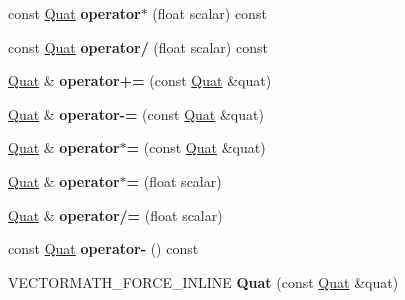 \begin{DoxyCompactItemize}
const \hyperlink{classVectormath_1_1Aos_1_1Quat}{Quat} {\bfseries operator$\ast$} (float scalar) const
\item 
\mbox{\label{classVectormath_1_1Aos_1_1Quat_ac427bfc84af666d57eebeab78da5f695}} 
const \hyperlink{classVectormath_1_1Aos_1_1Quat}{Quat} {\bfseries operator/} (float scalar) const
\item 
\mbox{\label{classVectormath_1_1Aos_1_1Quat_aabe44e8d880be75a7ebb00b0699585ba}} 
\hyperlink{classVectormath_1_1Aos_1_1Quat}{Quat} \& {\bfseries operator+=} (const \hyperlink{classVectormath_1_1Aos_1_1Quat}{Quat} \&quat)
\item 
\mbox{\label{classVectormath_1_1Aos_1_1Quat_ac5e010e1374872925702919385572dc9}} 
\hyperlink{classVectormath_1_1Aos_1_1Quat}{Quat} \& {\bfseries operator-\/=} (const \hyperlink{classVectormath_1_1Aos_1_1Quat}{Quat} \&quat)
\item 
\mbox{\label{classVectormath_1_1Aos_1_1Quat_aa2236fb5e7006f0bf72a23b4a4606c13}} 
\hyperlink{classVectormath_1_1Aos_1_1Quat}{Quat} \& {\bfseries operator$\ast$=} (const \hyperlink{classVectormath_1_1Aos_1_1Quat}{Quat} \&quat)
\item 
\mbox{\label{classVectormath_1_1Aos_1_1Quat_ab5da49301367b36085a58c53734433c9}} 
\hyperlink{classVectormath_1_1Aos_1_1Quat}{Quat} \& {\bfseries operator$\ast$=} (float scalar)
\item 
\mbox{\label{classVectormath_1_1Aos_1_1Quat_a5af07567b079fe049ca809335c5c3848}} 
\hyperlink{classVectormath_1_1Aos_1_1Quat}{Quat} \& {\bfseries operator/=} (float scalar)
\item 
\mbox{\label{classVectormath_1_1Aos_1_1Quat_ababc074bd904ad56ffc13dd6b6ce48e3}} 
const \hyperlink{classVectormath_1_1Aos_1_1Quat}{Quat} {\bfseries operator-\/} () const
\item 
\mbox{\label{classVectormath_1_1Aos_1_1Quat_a102854a15448f2159ad8ed45e2573275}} 
V\+E\+C\+T\+O\+R\+M\+A\+T\+H\+\_\+\+F\+O\+R\+C\+E\+\_\+\+I\+N\+L\+I\+NE {\bfseries Quat} (const \hyperlink{classVectormath_1_1Aos_1_1Quat}{Quat} \&quat)

\end{DoxyCompactItemize}

